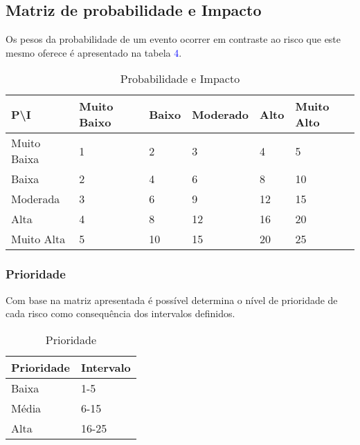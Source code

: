 \subsection{Matriz de probabilidade e Impacto}

	Os pesos da probabilidade de um evento ocorrer em contraste ao risco que este mesmo oferece é apresentado na tabela \textcolor{blue}{4}.  

\begin{table}[ht]
\centering
\caption{Probabilidade e Impacto}
\label{probabilidade-impacto}
\begin{tabular}{|l|l|l|l|l|l|}
\hline
P\textbackslash I  & Muito Baixo & Baixo & Moderado & Alto & Muito Alto \\ \hline
Muito Baixa                  & 1                               & 2                         & 3                   & 4               & 5                     \\ 
Baixa                    & 2                               & 4                         & 6                   & 8               & 10                    \\
Moderada                     & 3                               & 6                         & 9                   & 12              & 15                    \\ 
Alta                         & 4                               & 8                         & 12                  & 16              & 20                    \\ 
Muito Alta                   & 5                               & 10                        & 15                  & 20              & 25                    \\ 
\hline
\end{tabular}
\end{table}

\subsubsection{Prioridade}
Com base na matriz apresentada é possível determina o nível de prioridade de cada risco como consequência dos intervalos definidos.

\begin{table}[ht]
\centering
\caption{Prioridade}
\label{prioridade}
\begin{tabular}{|l|l|}
\hline
Prioridade & Intervalo \\ 
\hline
Baixa      & 1-5       \\ 
Média      & 6-15      \\ 
Alta       & 16-25     \\ 
\hline
\end{tabular}
\end{table}

